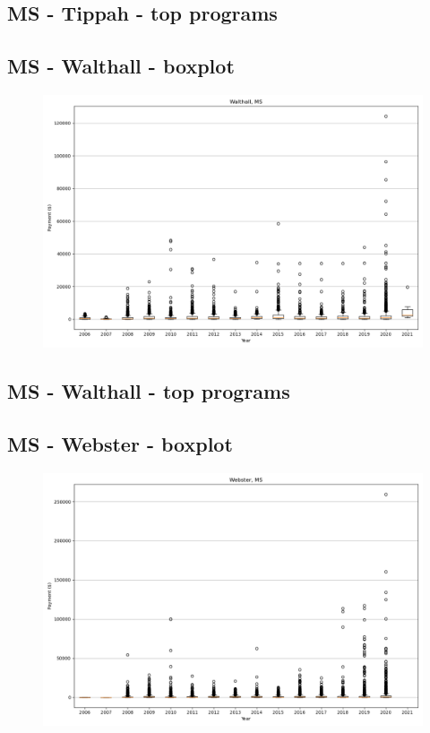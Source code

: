 \subsection*{MS - Tippah - top programs}

\newpage
\subsection*{MS - Walthall - boxplot}
\begin{figure}[h]
\centering
\includegraphics[width=7in]{../output/boxplots/counties/Walthall-MS_boxplot.png}
\end{figure}


\subsection*{MS - Walthall - top programs}

\newpage
\subsection*{MS - Webster - boxplot}
\begin{figure}[h]
\centering
\includegraphics[width=7in]{../output/boxplots/counties/Webster-MS_boxplot.png}
\end{figure}


